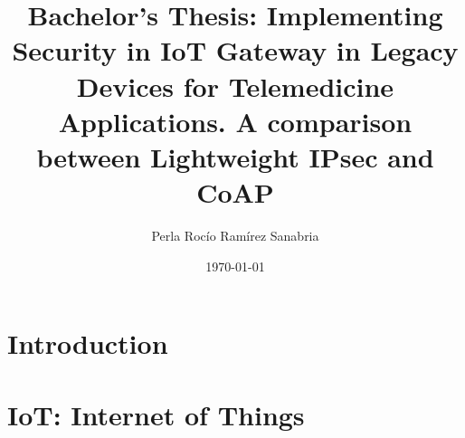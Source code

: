 \documentclass[11pt]{book}
\begin{document}
\renewcommand{\labelitemi}{$\textendash$}
\renewcommand{\labelitemii}{{\tiny$\blacksquare$}}
\thispagestyle{plain}

\title{Bachelor's Thesis: Implementing Security in IoT Gateway in Legacy Devices for Telemedicine Applications. A comparison between Lightweight IPsec and CoAP}
\author{Perla Rocío Ramírez Sanabria}
\date{\small{\today}}
\maketitle

\setcounter{tocdepth}{2}
\tableofcontents
\break

\chapter{Introduction}
\chapter{IoT: Internet of Things}
\end{document}
